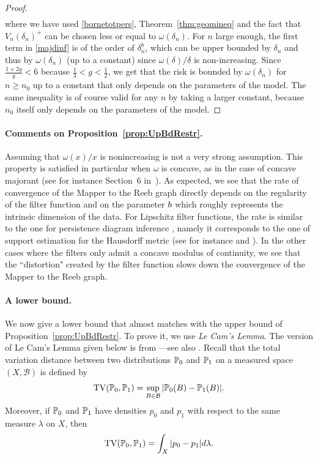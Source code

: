 \begin{proof}
\begin{eqnarray}
\end{eqnarray}
where we have used \eqref{bornetotpers}, Theorem~\ref{thm:geomineq} and the fact that $V_n(\delta_n)^+$ can be chosen less or equal to $\omega(\delta_n)$. 
For $n$ large enough, the first term in \eqref{majdinf} is of the order of $ \delta_n^b $,  which can be upper bounded by  $ \delta_n$ and thus by $\omega(\delta_n) $ (up to a constant) since $\omega(\delta) / \delta$ 
is non-increasing.
Since $\frac{1+2g}{g} < 6$ because $\frac13 < g < \frac 12$, we get that the risk is bounded by $ \omega(   \delta_n)   $ for $n\geq n_0$ up to a constant that only depends on the parameters of the model. 
The same inequality is of course valid for any $n$ by taking a larger constant, because $n_0$ itself only depends on the parameters of the model.
\end{proof}

\paragraph*{Comments on Proposition~\ref{prop:UpBdRestr}.}
Assuming that $\omega(x) / x $ is nonincreasing is not a very strong assumption. 
This property is satisfied in particular when $\omega$ is concave, as in the case of %
concave majorant %
(see for instance Section~6 in~\cite{DeVore93}).  As expected, we see that the rate of convergence of the Mapper to the Reeb graph directly depends on 
the regularity of the filter function and on the parameter $b$ which roughly represents the intrinsic dimension of the data. 
For Lipschitz filter functions, the rate is similar to the one for persistence diagram inference \cite{Chazal15c}, 
namely it corresponds to the one of support estimation for the Hausdorff metric (see for instance \cite{Cuevas04}
and \cite{Genovese12a}). In the other cases where the filters only admit a concave modulus of continuity, we see that 
the ``distortion" created by the filter function slows down the convergence of the Mapper to the Reeb graph.

\paragraph*{A lower bound.}
We now give a lower bound  %
that almost matches with the upper bound of Proposition~\ref{prop:UpBdRestr}.
To prove it, we use {\em Le Cam's Lemma}.
The  version of Le Cam's Lemma given below is from \cite{Yu97}---see also \cite{Genovese12b}. 
Recall that  the total variation distance between two distributions $\mathbb{P}_0$ and $\mathbb{P}_1$ on a measured space $(X, \mathcal B) $ 
is defined by $$ \operatorname{TV}(\mathbb{P}_0,\mathbb{P}_1)  = \sup_{B \in  \mathcal B} | \mathbb{P}_0(B) - \mathbb{P}_1(B) |.$$
Moreover, if $\mathbb{P}_0$ and $\mathbb{P}_1$ have densities $p_0$ and $p_1$
with respect to the same measure $\lambda$ on $X$, then 
$$ \TV(\p_0,\p_1)    %
= \int_{X} |p_0-p_1|  d \lambda. $$


